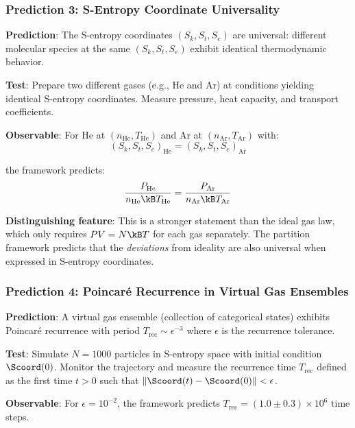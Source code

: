 \subsubsection{Prediction 3: S-Entropy Coordinate Universality}

\textbf{Prediction}: The S-entropy coordinates $(S_k, S_t, S_e)$ are universal: different molecular species at the same $(S_k, S_t, S_e)$ exhibit identical thermodynamic behavior.

\textbf{Test}: Prepare two different gases (e.g., He and Ar) at conditions yielding identical S-entropy coordinates. Measure pressure, heat capacity, and transport coefficients.

\textbf{Observable}: For He at $(n_{\text{He}}, T_{\text{He}})$ and Ar at $(n_{\text{Ar}}, T_{\text{Ar}})$ with:
\begin{equation}
(S_k, S_t, S_e)_{\text{He}} = (S_k, S_t, S_e)_{\text{Ar}}
\end{equation}

the framework predicts:
\begin{equation}
\frac{P_{\text{He}}}{n_{\text{He}}\kB T_{\text{He}}} = \frac{P_{\text{Ar}}}{n_{\text{Ar}}\kB T_{\text{Ar}}}
\end{equation}

\textbf{Distinguishing feature}: This is a stronger statement than the ideal gas law, which only requires $PV = N\kB T$ for each gas separately. The partition framework predicts that the \textit{deviations} from ideality are also universal when expressed in S-entropy coordinates.

\subsubsection{Prediction 4: Poincaré Recurrence in Virtual Gas Ensembles}

\textbf{Prediction}: A virtual gas ensemble (collection of categorical states) exhibits Poincaré recurrence with period $T_{\text{rec}} \sim \epsilon^{-3}$ where $\epsilon$ is the recurrence tolerance.

\textbf{Test}: Simulate $N = 1000$ particles in S-entropy space with initial condition $\Scoord(0)$. Monitor the trajectory and measure the recurrence time $T_{\text{rec}}$ defined as the first time $t > 0$ such that $\|\Scoord(t) - \Scoord(0)\| < \epsilon$.

\textbf{Observable}: For $\epsilon = 10^{-2}$, the framework predicts $T_{\text{rec}} = (1.0 \pm 0.3) \times 10^6$ time steps.

